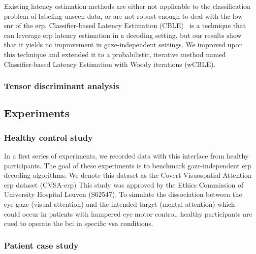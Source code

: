 Existing latency estimation methods are either not applicable to the
classification problem of labeling unseen data, or are not robust enough to
deal with the low \ac{snr} of the \ac{erp}.
Classifier-based Latency Estimation (CBLE)~\cite{Mowla2017} is a technique that can leverage
\ac{erp} latency estimation in a decoding setting, but our results show that it
yields no improvement in gaze-independent settings.
We improved upon this technique and extended it to a probabilistic, iterative
method named Classifier-based Latency Estimation with Woody iterations (wCBLE).

\subsubsection{Tensor discriminant analysis}

\subsection{Experiments}

\subsubsection{Healthy control study}
In a first series of experiments, we recorded data with this interface from healthy participants.
The goal of these experiments is to benchmark
gaze-independent \ac{erp} decoding algorithms.
We denote this dataset as the Covert Visuospatial Attention \ac{erp} dataset
(CVSA-\ac{erp})
This study was approved by the Ethics Commission of University Hospital Leuven
(S62547).
To simulate the dissociation between the eye gaze (visual attention) and the
intended target (mental attention) which could occur in patients with hampered eye
motor control, healthy participants are cued to operate the \ac{bci} in specific
\ac{vsa} conditions.

\subsubsection{Patient case study}



